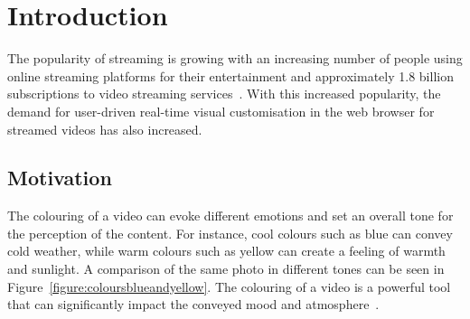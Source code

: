 \documentclass[../MasterThesis.tex]{subfiles}
\begin{document}
	\newpage
	\section{Introduction} \label{section:introduction}
	
	
	The popularity of streaming is growing with an increasing number of people using online streaming platforms for their entertainment and approximately 1.8 billion subscriptions to video streaming services~\cite{nielsen, stats}.
	With this increased popularity, the demand for user-driven real-time visual customisation in the web browser for streamed videos has also increased.
	
	
	
	
	
	
	
	
	
	
	
	
	
	
	
	
	
	
	\subsection{Motivation} \label{subsection:motivation}
	
	
	The colouring of a video can evoke different emotions and set an overall tone for the perception of the content. For instance, cool colours such as blue can convey cold weather, while warm colours such as yellow can create a feeling of warmth and sunlight. A comparison of the same photo in different tones can be seen in Figure~\ref{figure:coloursblueandyellow}.
	The colouring of a video is a powerful tool that can significantly impact the conveyed mood and atmosphere~\cite{colorgrading1, colorgrading2}.
	
	
\end{document}
